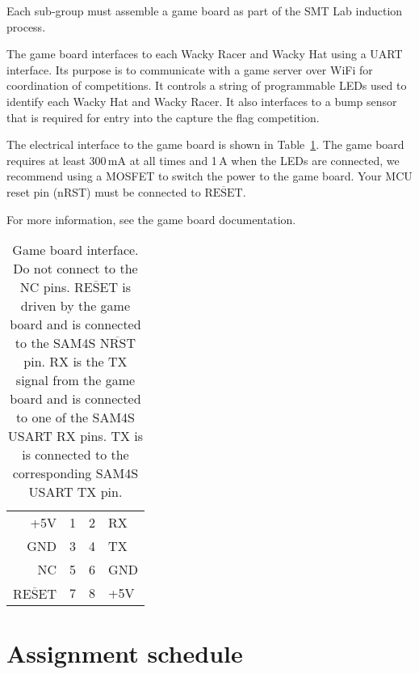 \documentclass[11pt, a4paper]{article}
\begin{document}
Each sub-group must assemble a game board as part of the SMT Lab
induction process.

The game board interfaces to each Wacky Racer and Wacky Hat using a
UART interface.  Its purpose is to communicate with a game server over
WiFi for coordination of competitions.  It controls a string of
programmable LEDs used to identify each Wacky Hat and Wacky Racer.  It
also interfaces to a bump sensor that is required for entry into the
capture the flag competition.

The electrical interface to the game board is shown in
Table~\ref{tab:board-interface}.  The game board requires at least 300\,mA at
all times and 1\,A when the LEDs are connected, we recommend using a MOSFET to
switch the power to the game board.  Your MCU reset pin (nRST) must be connected
to $\overline{\mathrm{RESET}}$.

For more information, see the game board documentation.


\begin{table}[H]
  \centering
  \begin{tabular}{r | c c | l }
    +5V                         &   1   &   2   & RX   \\
    GND                         &   3   &   4   & TX      \\
    NC                          &   5   &   6   & GND   \\
    $\overline{\mathrm{RESET}}$ &   7   &   8   & +5V     \\
  \end{tabular}
  \caption{Game board interface.  Do not connect to the NC pins.
    $\overline{\mathrm{RESET}}$ is driven by the game board and is
    connected to the SAM4S $\overline{\mathrm{NRST}}$ pin.  RX is the
    TX signal from the game board and is connected to one of the SAM4S
    USART RX pins.  TX is is connected to the corresponding SAM4S
    USART TX pin.}
  \label{tab:board-interface}
\end{table}



\pagebreak

\section{Assignment schedule}
\end{document}
